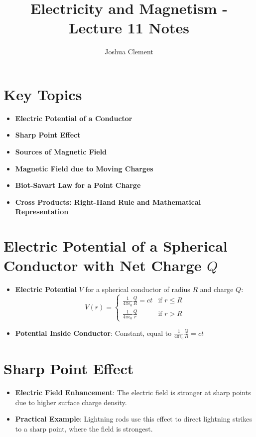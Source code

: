 \documentclass{article}
\begin{document}
\title{Electricity and Magnetism - Lecture 11 Notes}
\author{Joshua Clement}
\maketitle

\section*{Key Topics}
\begin{itemize}
    \item \textbf{Electric Potential of a Conductor}
    \item \textbf{Sharp Point Effect}
    \item \textbf{Sources of Magnetic Field}
    \item \textbf{Magnetic Field due to Moving Charges}
    \item \textbf{Biot-Savart Law for a Point Charge}
    \item \textbf{Cross Products: Right-Hand Rule and Mathematical Representation}
\end{itemize}

\section*{Electric Potential of a Spherical Conductor with Net Charge \(Q\)}
\begin{itemize}
    \item \textbf{Electric Potential} \(V\) for a spherical conductor of radius \(R\) and charge \(Q\):
    \[
    V(r) =
    \begin{cases}
        \frac{1}{4\pi\epsilon_0} \frac{Q}{R}=ct & \text{if } r \leq R \\
        \frac{1}{4\pi\epsilon_0} \frac{Q}{r} & \text{if } r > R
    \end{cases}
    \]
    \item \textbf{Potential Inside Conductor}: Constant, equal to \(\frac{1}{4\pi\epsilon_0} \frac{Q}{R}=ct\)
\end{itemize}

\section*{Sharp Point Effect}
\begin{itemize}
    \item \textbf{Electric Field Enhancement}: The electric field is stronger at sharp points due to higher surface charge density.
    \item \textbf{Practical Example}: Lightning rods use this effect to direct lightning strikes to a sharp point, where the field is strongest.
\end{itemize}
\end{document}
